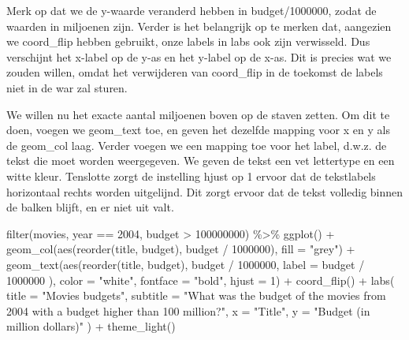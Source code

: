 \documentclass[]{tufte-book}
\newenvironment{Shaded}{}{}
\newcommand{\AttributeTok}[1]{\textcolor[rgb]{0.49,0.56,0.16}{#1}}
\newcommand{\DecValTok}[1]{\textcolor[rgb]{0.25,0.63,0.44}{#1}}
\newcommand{\FunctionTok}[1]{\textcolor[rgb]{0.02,0.16,0.49}{#1}}
\newcommand{\NormalTok}[1]{#1}
\newcommand{\SpecialCharTok}[1]{\textcolor[rgb]{0.25,0.44,0.63}{#1}}
\newcommand{\StringTok}[1]{\textcolor[rgb]{0.25,0.44,0.63}{#1}}
\begin{document}
Merk op dat we de y-waarde veranderd hebben in budget/1000000, zodat de waarden in miljoenen zijn. Verder is het belangrijk op te merken dat, aangezien we coord\_flip hebben gebruikt, onze labels in labs ook zijn verwisseld. Dus verschijnt het x-label op de y-as en het y-label op de x-as. Dit is precies wat we zouden willen, omdat het verwijderen van coord\_flip in de toekomst de labels niet in de war zal sturen.

We willen nu het exacte aantal miljoenen boven op de staven zetten. Om dit te doen, voegen we geom\_text toe, en geven het dezelfde mapping voor x en y als de geom\_col laag. Verder voegen we een mapping toe voor het label, d.w.z. de tekst die moet worden weergegeven. We geven de tekst een vet lettertype en een witte kleur. Tenslotte zorgt de instelling hjust op 1 ervoor dat de tekstlabels horizontaal rechts worden uitgelijnd. Dit zorgt ervoor dat de tekst volledig binnen de balken blijft, en er niet uit valt.

\begin{Shaded}
\begin{Highlighting}[]
\FunctionTok{filter}\NormalTok{(movies, year }\SpecialCharTok{==} \DecValTok{2004}\NormalTok{, budget }\SpecialCharTok{\textgreater{}} \DecValTok{100000000}\NormalTok{) }\SpecialCharTok{\%\textgreater{}\%}
  \FunctionTok{ggplot}\NormalTok{() }\SpecialCharTok{+}
  \FunctionTok{geom\_col}\NormalTok{(}\FunctionTok{aes}\NormalTok{(}\FunctionTok{reorder}\NormalTok{(title, budget), budget }\SpecialCharTok{/} \DecValTok{1000000}\NormalTok{), }\AttributeTok{fill =} \StringTok{"grey"}\NormalTok{) }\SpecialCharTok{+}
  \FunctionTok{geom\_text}\NormalTok{(}\FunctionTok{aes}\NormalTok{(}\FunctionTok{reorder}\NormalTok{(title, budget), budget }\SpecialCharTok{/} \DecValTok{1000000}\NormalTok{,}
    \AttributeTok{label =}\NormalTok{ budget }\SpecialCharTok{/} \DecValTok{1000000}
\NormalTok{  ), }\AttributeTok{color =} \StringTok{"white"}\NormalTok{, }\AttributeTok{fontface =} \StringTok{"bold"}\NormalTok{, }\AttributeTok{hjust =} \DecValTok{1}\NormalTok{) }\SpecialCharTok{+}
  \FunctionTok{coord\_flip}\NormalTok{() }\SpecialCharTok{+}
  \FunctionTok{labs}\NormalTok{(}
    \AttributeTok{title =} \StringTok{"Movies budgets"}\NormalTok{,}
    \AttributeTok{subtitle =} \StringTok{"What was the budget of the movies from 2004 with a budget higher than 100 million?"}\NormalTok{,}
    \AttributeTok{x =} \StringTok{"Title"}\NormalTok{,}
    \AttributeTok{y =} \StringTok{"Budget (in million dollars)"}
\NormalTok{  ) }\SpecialCharTok{+}
  \FunctionTok{theme\_light}\NormalTok{()}
\end{Highlighting}
\end{Shaded}
\end{document}

